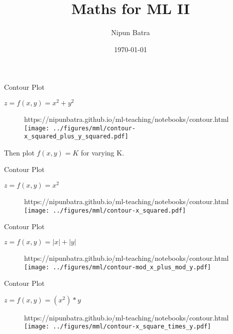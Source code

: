 \documentclass{beamer}
\title{Maths for ML II}
\date{\today}
\author{Nipun Batra}
\institute{IIT Gandhinagar}
\begin{document}
  \maketitle



\begin{frame}{Contour Plot}

	$z = f(x,y) = x^{2} + y^{2}$\\

	\begin{figure}[htp]
		\centering
		\begin{notebookbox}{https://nipunbatra.github.io/ml-teaching/notebooks/contour.html}
		  \texttt{[image: ../figures/mml/contour-x\_squared\_plus\_y\_squared.pdf]}
		\end{notebookbox}
	  \end{figure}

Then plot $f(x,y)=K$ for varying K.

\end{frame}


\begin{frame}{Contour Plot}

$z = f(x,y) = x^{2}$\\

\begin{figure}[htp]
	\centering
	\begin{notebookbox}{https://nipunbatra.github.io/ml-teaching/notebooks/contour.html}
	  \texttt{[image: ../figures/mml/contour-x\_squared.pdf]}
	\end{notebookbox}
  \end{figure}

\end{frame}

\begin{frame}{Contour Plot}

$z = f(x,y) = |x|+|y|$\\

\begin{figure}[htp]
	\centering
	\begin{notebookbox}{https://nipunbatra.github.io/ml-teaching/notebooks/contour.html}
	  \texttt{[image: ../figures/mml/contour-mod\_x\_plus\_mod\_y.pdf]}
	\end{notebookbox}
  \end{figure}

\end{frame}

\begin{frame}{Contour Plot}

$z = f(x,y) = (x^2)*y$\\

\begin{figure}[htp]
	\centering
	\begin{notebookbox}{https://nipunbatra.github.io/ml-teaching/notebooks/contour.html}
	  \texttt{[image: ../figures/mml/contour-x\_square\_times\_y.pdf]}
	\end{notebookbox}
  \end{figure}


\end{frame}
\end{document}
